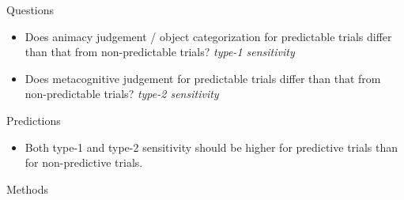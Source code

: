 \documentclass[final,12pt]{beamer}
\begin{document}
\begin{frame}[t]
\begin{columns}[t]
\begin{column}{\halfpagecol}
\begin{block}{Questions}
      \begin{itemize}
    \item Does animacy judgement / object categorization for predictable trials differ than that from non-predictable trials? \textit{type-1 sensitivity}
  \item Does metacognitive judgement for predictable trials differ than that from non-predictable trials? \textit{type-2 sensitivity}
  \end{itemize}
  
  
   
  
    \vspace{-0.2em}
    
    \end{block}

 
   \vspace{-0.15em}
   
    \begin{block}{Predictions}
      \vspace{-2.3cm}
      \vspace{1.2em}
    
      \begin{itemize}
    \item Both type-1 and type-2 sensitivity should be higher for predictive trials than for non-predictive trials.
  \end{itemize}
  
     \vspace{-0.2em}
    
    \end{block}
    
    
    
    \vspace{-0.2em}
    \begin{block}{Methods}
      
        

\end{block}
\end{column}
\end{columns}
\end{frame}
\end{document}
